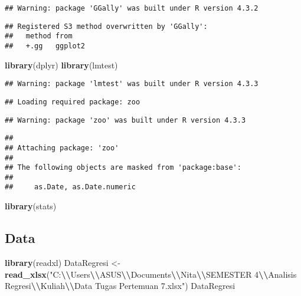 \documentclass[
]{article}
\newenvironment{Shaded}{\begin{snugshade}}{\end{snugshade}}
\newcommand{\FunctionTok}[1]{\textcolor[rgb]{0.13,0.29,0.53}{\textbf{#1}}}
\newcommand{\NormalTok}[1]{#1}
\newcommand{\OtherTok}[1]{\textcolor[rgb]{0.56,0.35,0.01}{#1}}
\newcommand{\SpecialCharTok}[1]{\textcolor[rgb]{0.81,0.36,0.00}{\textbf{#1}}}
\newcommand{\StringTok}[1]{\textcolor[rgb]{0.31,0.60,0.02}{#1}}
\begin{document}
\begin{verbatim}
## Warning: package 'GGally' was built under R version 4.3.2
\end{verbatim}

\begin{verbatim}
## Registered S3 method overwritten by 'GGally':
##   method from   
##   +.gg   ggplot2
\end{verbatim}

\begin{Shaded}
\begin{Highlighting}[]
\FunctionTok{library}\NormalTok{(dplyr)}
\FunctionTok{library}\NormalTok{(lmtest)}
\end{Highlighting}
\end{Shaded}

\begin{verbatim}
## Warning: package 'lmtest' was built under R version 4.3.3
\end{verbatim}

\begin{verbatim}
## Loading required package: zoo
\end{verbatim}

\begin{verbatim}
## Warning: package 'zoo' was built under R version 4.3.3
\end{verbatim}

\begin{verbatim}
## 
## Attaching package: 'zoo'
## 
## The following objects are masked from 'package:base':
## 
##     as.Date, as.Date.numeric
\end{verbatim}

\begin{Shaded}
\begin{Highlighting}[]
\FunctionTok{library}\NormalTok{(stats)}
\end{Highlighting}
\end{Shaded}

\hypertarget{data}{%
\subsection{Data}\label{data}}

\begin{Shaded}
\begin{Highlighting}[]
\FunctionTok{library}\NormalTok{(readxl)}
\NormalTok{DataRegresi }\OtherTok{\textless{}{-}} \FunctionTok{read\_xlsx}\NormalTok{(}\StringTok{"C:}\SpecialCharTok{\textbackslash{}\textbackslash{}}\StringTok{Users}\SpecialCharTok{\textbackslash{}\textbackslash{}}\StringTok{ASUS}\SpecialCharTok{\textbackslash{}\textbackslash{}}\StringTok{Documents}\SpecialCharTok{\textbackslash{}\textbackslash{}}\StringTok{Nita}\SpecialCharTok{\textbackslash{}\textbackslash{}}\StringTok{SEMESTER 4}\SpecialCharTok{\textbackslash{}\textbackslash{}}\StringTok{Analisis Regresi}\SpecialCharTok{\textbackslash{}\textbackslash{}}\StringTok{Kuliah}\SpecialCharTok{\textbackslash{}\textbackslash{}}\StringTok{Data Tugas Pertemuan 7.xlsx"}\NormalTok{)}
\NormalTok{DataRegresi}
\end{Highlighting}
\end{Shaded}
\end{document}

